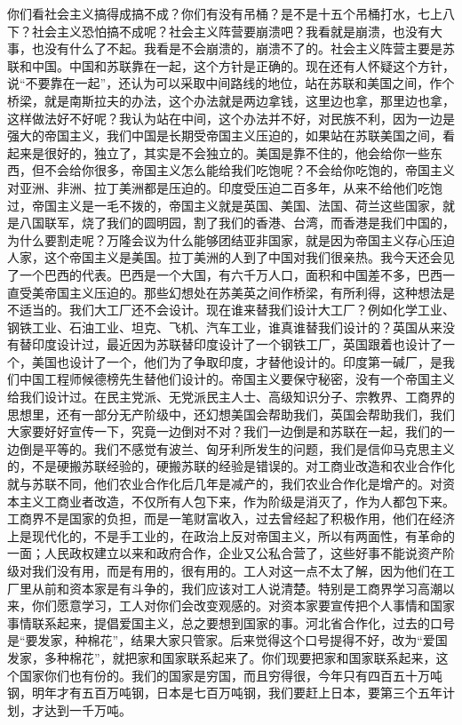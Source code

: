 你们看社会主义搞得成搞不成？你们有没有吊桶？是不是十五个吊桶打水，七上八下？社会主义恐怕搞不成呢？社会主义阵营要崩溃吧？我看就是崩溃，也没有大事，也没有什么了不起。我看是不会崩溃的，崩溃不了的。社会主义阵营主要是苏联和中国。中国和苏联靠在一起，这个方针是正确的。现在还有人怀疑这个方针，说“不要靠在一起”，还认为可以采取中间路线的地位，站在苏联和美国之间，作个桥梁，就是南斯拉夫的办法，这个办法就是两边拿钱，这里边也拿，那里边也拿，这样做法好不好呢？我认为站在中间，这个办法并不好，对民族不利，因为一边是强大的帝国主义，我们中国是长期受帝国主义压迫的，如果站在苏联美国之间，看起来是很好的，独立了，其实是不会独立的。美国是靠不住的，他会给你一些东西，但不会给你很多，帝国主义怎么能给我们吃饱呢？不会给你吃饱的，帝国主义对亚洲、非洲、拉丁美洲都是压迫的。印度受压迫二百多年，从来不给他们吃饱过，帝国主义是一毛不拨的，帝国主义就是英国、美国、法国、荷兰这些国家，就是八国联军，烧了我们的圆明园，割了我们的香港、台湾，而香港是我们中国的，为什么要割走呢？万隆会议为什么能够团结亚非国家，就是因为帝国主义存心压迫人家，这个帝国主义是美国。拉丁美洲的人到了中国对我们很亲热。我今天还会见了一个巴西的代表。巴西是一个大国，有六千万人口，面积和中国差不多，巴西一直受美帝国主义压迫的。那些幻想处在苏美英之间作桥梁，有所利得，这种想法是不适当的。我们大工厂还不会设计。现在谁来替我们设计大工厂？例如化学工业、钢铁工业、石油工业、坦克、飞机、汽车工业，谁真谁替我们设计的？英国从来没有替印度设计过，最近因为苏联替印度设计了一个钢铁工厂，英国跟着也设计了一个，美国也设计了一个，他们为了争取印度，才替他设计的。印度第一碱厂，是我们中国工程师候德榜先生替他们设计的。帝国主义要保守秘密，没有一个帝国主义给我们设计过。在民主党派、无党派民主人士、高级知识分子、宗教界、工商界的思想里，还有一部分无产阶级中，还幻想美国会帮助我们，英国会帮助我们，我们大家要好好宣传一下，究竟一边倒对不对？我们一边倒是和苏联在一起，我们的一边倒是平等的。我们不感觉有波兰、匈牙利所发生的问题，我们是信仰马克思主义的，不是硬搬苏联经验的，硬搬苏联的经验是错误的。对工商业改造和农业合作化就与苏联不同，他们农业合作化后几年是减产的，我们农业合作化是增产的。对资本主义工商业者改造，不仅所有人包下来，作为阶级是消灭了，作为人都包下来。工商界不是国家的负担，而是一笔财富收入，过去曾经起了积极作用，他们在经济上是现代化的，不是手工业的，在政治上反对帝国主义，所以有两面性，有革命的一面；人民政权建立以来和政府合作，企业又公私合营了，这些好事不能说资产阶级对我们没有用，而是有用的，很有用的。工人对这一点不太了解，因为他们在工厂里从前和资本家是有斗争的，我们应该对工人说清楚。特别是工商界学习高潮以来，你们愿意学习，工人对你们会改变观感的。对资本家要宣传把个人事情和国家事情联系起来，提倡爱国主义，总之要想到国家的事。河北省合作化，过去的口号是“要发家，种棉花”，结果大家只管家。后来觉得这个口号提得不好，改为“爱国发家，多种棉花”，就把家和国家联系起来了。你们现要把家和国家联系起来，这个国家你们也有份的。我们的国家是穷国，而且穷得很，今年只有四百五十万吨钢，明年才有五百万吨钢，日本是七百万吨钢，我们要赶上日本，要第三个五年计划，才达到一千万吨。

